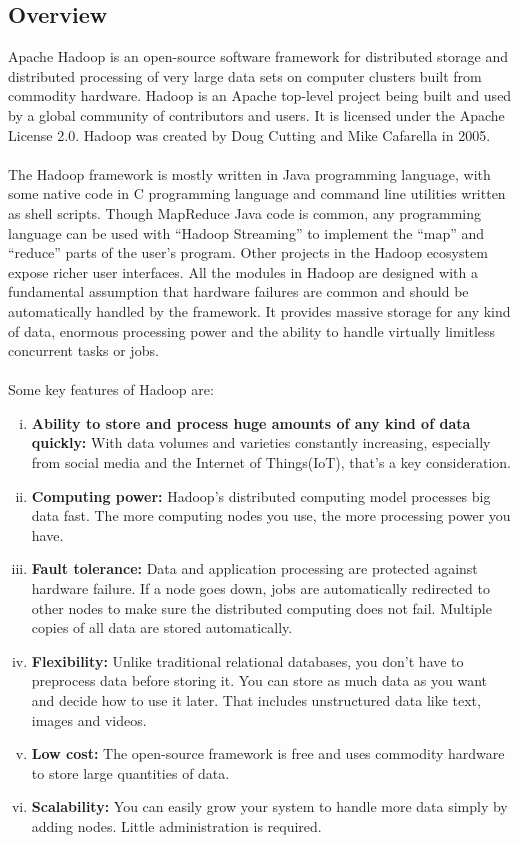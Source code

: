 \documentclass[a4paper,12pt,oneside]{report}
\begin{document}
\subsection{Overview}
Apache Hadoop is an open-source software framework for distributed storage
and distributed processing of very large data sets on computer clusters built from commodity
hardware.\cite{Apache} Hadoop is an Apache top-level project being built and used by a global
community of contributors and users. It is licensed under the Apache License 2.0.\cite{Introapache} 
Hadoop was created by Doug Cutting and Mike Cafarella in 2005.\\
\\
The Hadoop framework is mostly written in Java programming language,
with some native code in C programming language and command line utilities
written as shell scripts. Though MapReduce Java code is common, any programming language can
be used with “Hadoop Streaming” to implement the “map” and “reduce” parts of the user’s program.\cite{Hadoopadventures}
Other projects in the Hadoop ecosystem expose richer user interfaces.
All the modules in Hadoop are designed with a fundamental assumption that
hardware failures are common and should be automatically handled by the framework.
It provides massive storage for any kind of data, enormous processing power and the ability to handle virtually
limitless concurrent tasks or jobs.\\
\\
Some key features of Hadoop are:
\begin{enumerate}[(i)]
        \item \textbf{Ability to store and process huge amounts of any kind of data quickly:}
                With data volumes and varieties constantly increasing, especially from social media and the Internet of Things(IoT), that’s a key consideration.
        \item \textbf{Computing power:} Hadoop’s distributed computing model processes big data fast. The more computing nodes you use, the more processing power you have.
        \item \textbf{Fault tolerance:} Data and application processing are protected against hardware failure. If a node goes down, jobs are automatically redirected to other nodes to make sure the distributed computing does not fail. Multiple copies of all data are stored automatically.
        \item \textbf{Flexibility:} Unlike traditional relational databases, you don’t have to preprocess data before storing it. You can store as much data as you want and decide how to use it later. That includes unstructured data like text, images and videos.
        \item \textbf{Low cost:} The open-source framework is free and uses commodity hardware to store large quantities of data.
        \item \textbf{Scalability:} You can easily grow your system to handle more data simply by adding nodes. Little administration is required.
\end{enumerate}
\end{document}
